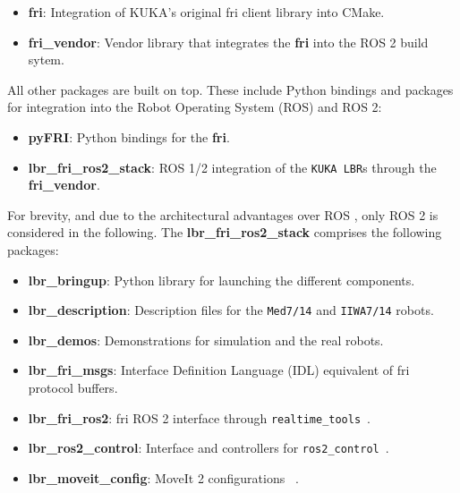 \begin{itemize}
\item
  \textbf{fri}: Integration of KUKA's original \acrshort{fri} client library into
  CMake.
\item
  \textbf{fri\_vendor}: Vendor library that integrates the \textbf{fri}
  into the ROS 2 build sytem.
\end{itemize}

All other packages are built on top. These include Python bindings and
packages for integration into the Robot Operating System (ROS) and ROS
2:

\begin{itemize}
\item
  \textbf{pyFRI}: Python bindings for the \textbf{fri}.
\item
  \textbf{lbr\_fri\_ros2\_stack}: ROS 1/2 integration of the
  \texttt{KUKA\ LBR}s through the \textbf{fri\_vendor}.
\end{itemize}

For brevity, and due to the architectural advantages over ROS
\cite{ref-ros2}, only ROS 2 is
considered in the following. The \textbf{lbr\_fri\_ros2\_stack}
comprises the following packages:

\begin{itemize}
\item
  \textbf{lbr\_bringup}: Python library for launching the different
  components.
\item
  \textbf{lbr\_description}: Description files for the \texttt{Med7/14}
  and \texttt{IIWA7/14} robots.
\item
  \textbf{lbr\_demos}: Demonstrations for simulation and the real
  robots.
\item
  \textbf{lbr\_fri\_msgs}: Interface Definition Language (IDL)
  equivalent of \acrshort{fri} protocol buffers.
\item
  \textbf{lbr\_fri\_ros2}: \acrshort{fri} ROS 2 interface through
  \texttt{realtime\_tools}~\cite{ref-ros_control}.
\item
  \textbf{lbr\_ros2\_control}: Interface and controllers for
  \texttt{ros2\_control}~\cite{ref-ros2_control}.
\item
  \textbf{lbr\_moveit\_config}: MoveIt 2 configurations
 ~\cite{ref-moveit}.
\end{itemize}

